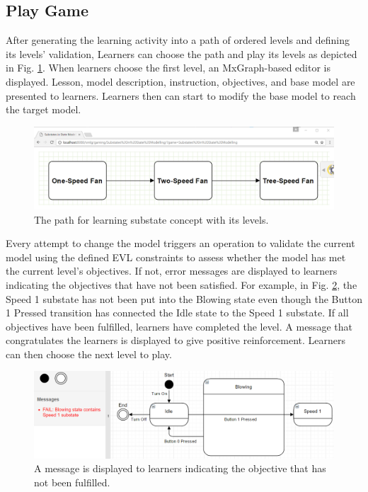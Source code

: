 \documentclass[conference]{IEEEtran}
\begin{document}
\subsection{Play Game}
After generating the learning activity into a path of ordered levels and defining its levels' validation, Learners can choose the path and play its levels as depicted in Fig. \ref{path}. When learners choose the first level, an MxGraph-based editor is displayed. Lesson, model description, instruction, objectives, and base model are presented to learners. Learners then can start to modify the base model to reach the target model. 

\begin{figure}[!t]
\centering
\includegraphics[width=\linewidth]{path}
\caption{The path for learning substate concept with its levels.}
\label{path}
\end{figure}    

Every attempt to change the model triggers an operation to validate the current model using the defined EVL constraints to assess whether the model has met the current level's objectives. If not, error messages are displayed to learners indicating the objectives that have not been satisfied. For example, in Fig. \ref{example-fail-messages}, the Speed 1 substate has not been put into the Blowing state even though the Button 1 Pressed transition has connected the Idle state to the Speed 1 substate. If all objectives have been fulfilled, learners have completed the level. A message that congratulates the learners is displayed to give positive reinforcement. Learners can then choose the next level to play.  

\begin{figure}[!t]
\centering
\includegraphics[width=\linewidth]{example-fail-messages}
\caption{A message is displayed to learners indicating the objective that has not been fulfilled.}
\label{example-fail-messages}
\end{figure}  
\end{document}
